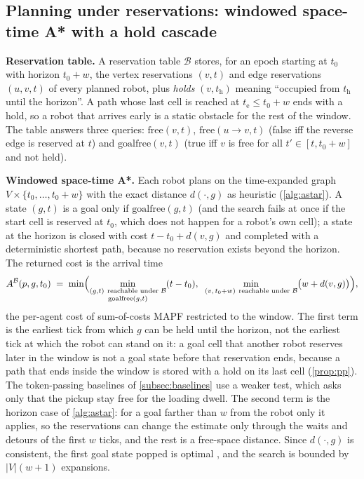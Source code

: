 \subsection{Planning under reservations: windowed space-time A* with a hold cascade}\label{subsec:planning}

\noindent\textbf{Reservation table.}
A reservation table $\mathcal{B}$ stores, for an epoch starting at $t_0$ with
horizon $t_0+w$, the vertex reservations $(v,t)$ and edge reservations
$(u,v,t)$ of every planned robot, plus \emph{holds} $(v,t_{\mathrm{h}})$
meaning ``occupied from $t_{\mathrm{h}}$ until the horizon''. A path whose
last cell is reached at $t_{\mathrm{e}}\le t_0+w$ ends with a hold, so a
robot that arrives early is a static obstacle for the rest of the window.
The table answers three queries: $\mathrm{free}(v,t)$,
$\mathrm{free}(u\!\to\!v,t)$ (false iff the reverse edge is reserved at $t$)
and $\mathrm{goalfree}(v,t)$ (true iff $v$ is free for all
$t'\in[t,t_0+w]$ and not held).

\noindent\textbf{Windowed space-time A*.}
Each robot plans on the time-expanded graph
$V\times\{t_0,\dots,t_0+w\}$ with the exact distance $d(\cdot,g)$ as
heuristic (\cref{alg:astar}). A state $(g,t)$ is a goal only if
$\mathrm{goalfree}(g,t)$ (and the search fails at once if the start cell
is reserved at $t_0$, which does not happen for a robot's own cell); a state at the horizon is closed with cost
$t-t_0+d(v,g)$ and completed with a deterministic shortest path, because no
reservation exists beyond the horizon. The returned cost is the arrival time
\begin{equation}\label{eq:arrival}
  A^{\mathcal{B}}(p,g,t_0) \;=\; \min\Bigl(
  \min_{\substack{(g,t)\ \text{reachable under }\mathcal{B}\\ \mathrm{goalfree}(g,t)}} (t - t_0),\;\;
  \min_{(v,\,t_0+w)\ \text{reachable under }\mathcal{B}} \bigl(w + d(v,g)\bigr)\Bigr),
\end{equation}
the per-agent cost of sum-of-costs MAPF restricted to the window. The first
term is the earliest tick from which $g$ can be held until the horizon, not the
earliest tick at which the robot can stand on it: a goal cell that another robot
reserves later in the window is not a goal state before that reservation ends,
because a path that ends inside the window is stored with a hold on its last
cell (\cref{prop:pp}). The token-passing baselines of \cref{subsec:baselines}
use a weaker test, which asks only that the pickup stay free for the loading
dwell. The second
term is the horizon case of \cref{alg:astar}: for a goal farther than $w$
from the robot only it applies, so the reservations can change the estimate
only through the waits and detours of the first $w$ ticks, and the rest is a
free-space distance. Since
$d(\cdot,g)$ is consistent, the first goal state popped is optimal
\citep{hart1968astar}, and the
search is bounded by $|V|(w+1)$ expansions.

